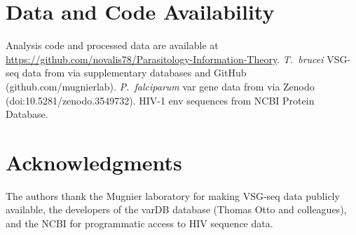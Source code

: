 \documentclass[twocolumn,10pt]{article}
\begin{document}
\section*{Data and Code Availability}

Analysis code and processed data are available at \url{https://github.com/novalis78/Parasitology-Information-Theory}.  \textit{T.~brucei} VSG-seq data from \citet{mugnier2015} via supplementary databases and GitHub (github.com/mugnierlab).  \textit{P.~falciparum} var gene data from \citet{otto2019} via Zenodo (doi:10.5281/zenodo.3549732).  HIV-1 env sequences from NCBI Protein Database.

\section*{Acknowledgments}

The authors thank the Mugnier laboratory for making VSG-seq data publicly available, the developers of the varDB database (Thomas Otto and colleagues), and the NCBI for programmatic access to HIV sequence data.

{\small
\setlength{\bibsep}{2pt plus 0.5pt minus 0.5pt}

}
\end{document}
